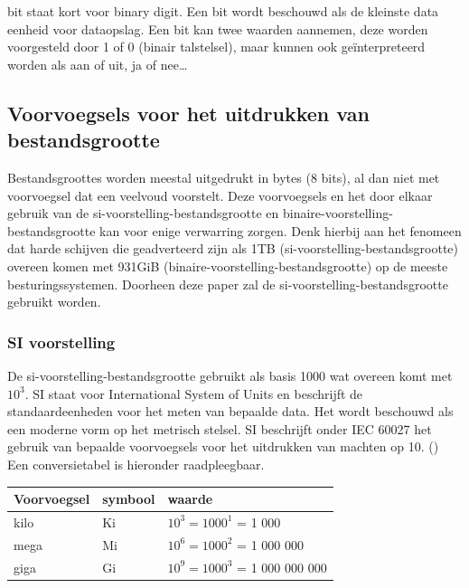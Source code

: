 \Gls{bit} staat kort voor binary digit. Een bit wordt beschouwd als de kleinste data eenheid voor dataopslag. Een bit kan twee waarden aannemen, deze worden voorgesteld door 1 of 0 (binair talstelsel), maar kunnen ook geïnterpreteerd worden als aan of uit, ja of nee…

\subsection{Voorvoegsels voor het uitdrukken van bestandsgrootte}
\label{sec:bestandsgrootte-dataopslag-voorvoegsels}

Bestandsgroottes worden meestal uitgedrukt in bytes (8 bits), al dan niet met voorvoegsel dat een veelvoud voorstelt. Deze voorvoegsels en het door elkaar gebruik van de \gls{si-voorstelling-bestandsgrootte} en \gls{binaire-voorstelling-bestandsgrootte} kan voor enige verwarring zorgen. Denk hierbij aan het fenomeen dat harde schijven die geadverteerd zijn als 1TB (\gls{si-voorstelling-bestandsgrootte}) overeen komen met 931GiB (\gls{binaire-voorstelling-bestandsgrootte}) op de meeste besturingssystemen. Doorheen deze paper zal de \gls{si-voorstelling-bestandsgrootte} gebruikt worden.

\subsubsection{SI voorstelling}
\label{sec:bestandsgrootte-dataopslag-voorvoegsels-si}

De \gls{si-voorstelling-bestandsgrootte} gebruikt als basis 1000 wat overeen komt met $ 10^{3} $. SI staat voor International System of Units en beschrijft de standaardeenheden voor het meten van bepaalde data. Het wordt beschouwd als een moderne vorm op het metrisch stelsel. SI beschrijft onder IEC 60027 het gebruik van bepaalde voorvoegsels voor het uitdrukken van machten op 10. (\cite{iec60027}) Een conversietabel is hieronder raadpleegbaar. 

\FloatBarrier
\begin{table}[h]
	\begin{tabular}{|l|l|l|}
		\hline
		\textbf{Voorvoegsel} & \textbf{symbool} & \textbf{waarde} \\ \hline
		kilo & Ki & $ 10^{3} = 1000^{1} $  = 1 000 \\ \hline
		mega & Mi & $ 10^{6} = 1000^{2} $  = 1 000 000 \\ \hline
		giga & Gi & $ 10^{9} = 1000^{3} $  = 1 000 000 000 \\ \hline
	\end{tabular}
\end{table}
\FloatBarrier

